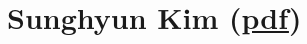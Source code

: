 \section{\texorpdfstring{Sunghyun Kim
(\href{pdf/cv.pdf}{pdf})}{Sunghyun Kim (pdf)}}\label{sunghyun-kim-pdf}
